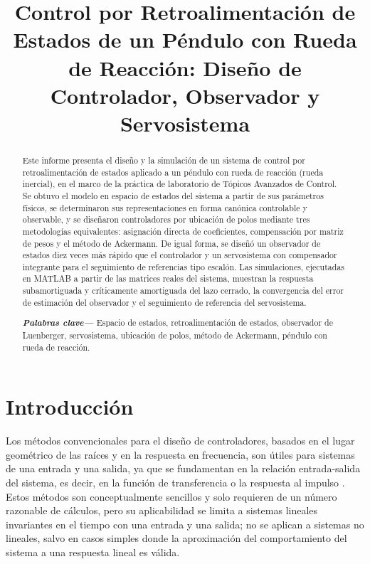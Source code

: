 \documentclass[conference]{IEEEtran}
\begin{document}
\title{Control por Retroalimentación de Estados de un Péndulo con Rueda de Reacción: Diseño de Controlador, Observador y Servosistema}

\author{
}

\maketitle

\begin{abstract}
Este informe presenta el diseño y la simulación de un sistema de control por retroalimentación de estados aplicado a un péndulo con rueda de reacción (rueda inercial), en el marco de la práctica de laboratorio de Tópicos Avanzados de Control. Se obtuvo el modelo en espacio de estados del sistema a partir de sus parámetros físicos, se determinaron sus representaciones en forma canónica controlable y observable, y se diseñaron controladores por ubicación de polos mediante tres metodologías equivalentes: asignación directa de coeficientes, compensación por matriz de pesos y el método de Ackermann. De igual forma, se diseñó un observador de estados diez veces más rápido que el controlador y un servosistema con compensador integrante para el seguimiento de referencias tipo escalón. Las simulaciones, ejecutadas en MATLAB a partir de las matrices reales del sistema, muestran la respuesta subamortiguada y críticamente amortiguada del lazo cerrado, la convergencia del error de estimación del observador y el seguimiento de referencia del servosistema.

\vspace{1em}
\noindent \textbf{\textit{Palabras clave---}} Espacio de estados, retroalimentación de estados, observador de Luenberger, servosistema, ubicación de polos, método de Ackermann, péndulo con rueda de reacción.
\end{abstract}

\section{Introducción}

Los métodos convencionales para el diseño de controladores, basados en el lugar geométrico de las raíces y en la respuesta en frecuencia, son útiles para sistemas de una entrada y una salida, ya que se fundamentan en la relación entrada-salida del sistema, es decir, en la función de transferencia o la respuesta al impulso \cite{ogata_discreto}. Estos métodos son conceptualmente sencillos y solo requieren de un número razonable de cálculos, pero su aplicabilidad se limita a sistemas lineales invariantes en el tiempo con una entrada y una salida; no se aplican a sistemas no lineales, salvo en casos simples donde la aproximación del comportamiento del sistema a una respuesta lineal es válida.
\end{document}
